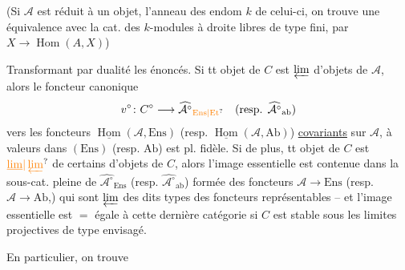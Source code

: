 (Si $\mathcal A$ est réduit à un objet,  l'anneau
des endom $k$ de celui-ci, on
trouve une équivalence avec la
cat. des $k$-modules à droite
libres de type fini, par $X\to\operatorname{Hom}(A,X)$)

Transformant par dualité les énoncés.
Si tt objet de $C$ est $\varprojlim$
d'objets de $\mathcal A$, alors le foncteur
canonique
\[
 v^{\circ}\colon C^{\circ}\longrightarrow \widehat{\mathcal A^{\circ}}_{\unsure{\mathrm{Ens}|\mathrm{Et}}}
 \quad(\text{resp. }\widehat{\mathcal A^{\circ}}_{\mathrm{ab}})
\]
vers les foncteurs $\underline{\operatorname{Hom}}(\mathcal A,\mathrm{Ens})$ (resp. $\underline{\operatorname{Hom}}(\mathcal A,\mathrm{Ab})$)
\uline{covariants} sur $\mathcal A$, à valeurs dans
$(\mathrm{Ens})$ (resp. $\mathrm{Ab}$) est pl. fidèle. Si
de plus, tt objet de $C$ est
$\unsure{\underline{\lim}|\varprojlim}$ de certains  d'objets
de $C$, alors l'image essentielle est
contenue dans la sous-cat. pleine
de $\widehat{\mathcal A^{\circ}}_{\mathrm{Ens}}$ (resp. $\widehat{\mathcal A^{\circ}}_{\mathrm{ab}}$) formée des
foncteurs $\mathcal A\to\mathrm{Ens}$ (resp. $\mathcal A\to\mathrm{Ab}$,)
qui sont $\varprojlim$ des dits types des
foncteurs représentables -- et
l'image essentielle est $=$ égale à
cette dernière catégorie si
$C$ est stable sous les limites projectives
de type envisagé.

En particulier, on trouve

